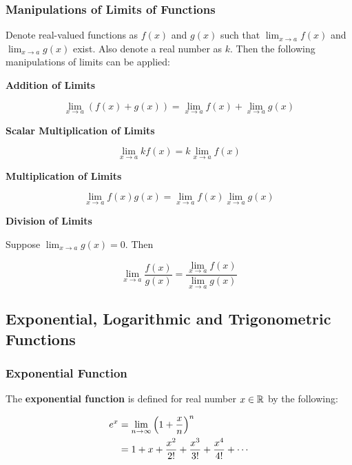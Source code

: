 \documentclass[a4paper,12pt]{article}
\begin{document}
\subsubsection{Manipulations of Limits of Functions}
\begin{pst}
  Denote real-valued functions as $f(x)$ and $g(x)$ such that $\lim_{x\to a}f(x)$ and $\lim_{x\to a}g(x)$ exist. Also denote a real number as $k$. Then the following manipulations of limits can be applied:

  \begin{alist}
    \item \textbf{Addition of Limits}

    $$\lim_{x\to a}(f(x)+g(x))=\lim_{x\to a}f(x)+\lim_{x\to a}g(x)$$

    \item \textbf{Scalar Multiplication of Limits}

    $$\lim_{x\to a}kf(x)=k\lim_{x\to a}f(x)$$

    \item \textbf{Multiplication of Limits}

    $$\lim_{x\to a}f(x)g(x)=\lim_{x\to a}f(x)\lim_{x\to a}g(x)$$

    \item \textbf{Division of Limits}\n

    Suppose $\lim_{x\to a}g(x)=0$. Then

    $$\lim_{x\to a}\frac{f(x)}{g(x)}=\frac{\lim_{x\to a}f(x)}{\lim_{x\to a}g(x)}$$
  \end{alist}
\end{pst}

\subsection{Exponential, Logarithmic and Trigonometric Functions}
\subsubsection{Exponential Function}
\begin{dft}
  The \textbf{exponential function} is defined for real number $x\in \mathbb{R}$ by the following:

  $$\begin{aligned}[t]
    e^{x}&=\lim_{n\to\infty}\left( 1+\frac{x}{n}\right)^{n}\\
    &=1+x+\frac{x^{2}}{2!}+\frac{x^{3}}{3!}+\frac{x^{4}}{4!}+\cdots
  \end{aligned}$$
\end{dft}\n
\end{document}
